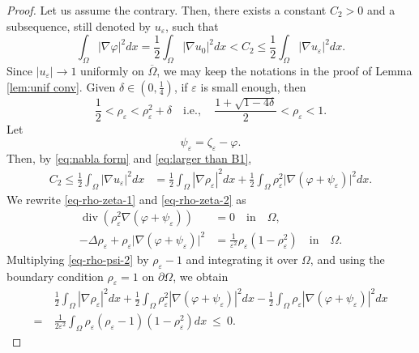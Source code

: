 \documentclass[10pt,a4paper]{amsart}
\newcommand{\Om}{{\Omega}}
\newcommand{\qie}{{\quad \mbox{i.e.}, \quad}}
\newcommand{\qin}{{\quad \mbox{in} \quad}}
\newcommand{\ve}{{\varepsilon}}
\newcommand{\vp}{{\varphi}}
\begin{document}
\begin{proof}
Let us assume the contrary.
Then,  there exists a constant $C_2>0$ and a subsequence, still denoted by $u_\ve$, such that
\begin{equation}\label{eq:larger than B1}
\int_\Omega |\nabla \vp|^2 dx=\frac12 \int_\Om |\nabla u_0|^2 dx< C_2 \le  \frac12 \int_\Om |\nabla u_\ve|^2 dx.
\end{equation}
 Since  $|u_\varepsilon| \to 1$ uniformly on $\overline\Omega$, we may keep the notations in the proof of Lemma \ref{lem:unif conv}.
Given   $\delta \in (0,\frac14)$, if $\ve$ is small enough, then
\begin{equation}\label{eq:delta chosen}
\frac{1}{2} < \rho_\ve <\rho_\ve^2 +\delta  \qie \frac{1+\sqrt{1-4\delta} }{2} <\rho_\ve <1.
\end{equation}
Let
\[ \psi_\varepsilon = \zeta_\varepsilon - \varphi.
\]
Then, by \eqref{eq:nabla form} and \eqref{eq:larger than B1},
\begin{equation}\label{eq:nabla u formula}
\begin{aligned}
C_2 \le  \frac{1}{2} \int_\Omega |\nabla u_\varepsilon|^2  dx
&=    \frac{1}{2} \int_\Omega |\nabla \rho_\varepsilon|^2  dx
+\frac{1}{2} \int_\Omega \rho_\varepsilon^2 \big|\nabla (\vp +\psi_\ve) \big|^2 dx.
\end{aligned}
\end{equation}
We rewrite \eqref{eq-rho-zeta-1} and \eqref{eq-rho-zeta-2} as 
\begin{align}\label{eq-rho-psi-1}
\operatorname{div}\left( \rho_\varepsilon^2 \nabla( \varphi + \psi_\varepsilon ) \right) &= 0 \qin \Omega, \\
\label{eq-rho-psi-2}
-\Delta \rho_\ve + \rho_\ve\big| \nabla (\varphi + \psi_\varepsilon )\big|^2 & = \frac{1}{\ve^2}\rho_\ve(1- \rho_\ve^2) \qin \Om.
\end{align}
Multiplying \eqref{eq-rho-psi-2} by $ \rho_\varepsilon - 1 $  and  integrating it over $ \Omega $, and using the boundary
condition $ \rho_\varepsilon  =1 $ on $\partial\Omega$, we obtain
\begin{equation}\label{eq-rho-psi-2-1}
\begin{aligned}
&\frac12\int_\Omega |\nabla \rho_\varepsilon|^2  dx +
\frac12 \int_\Omega\rho_\ve^2 | \nabla (\varphi + \psi_\varepsilon )|^2 dx - \frac12 \int_\Omega \rho_\ve | \nabla (\varphi + \psi_\varepsilon )|^2 dx \\
=~& \frac{1}{2\ve^2}\int_\Omega \rho_\ve( \rho_\varepsilon - 1)(1- \rho_\ve^2) dx  ~\leq~ 0.
\end{aligned}

\end{equation}
\end{proof}
\end{document}
